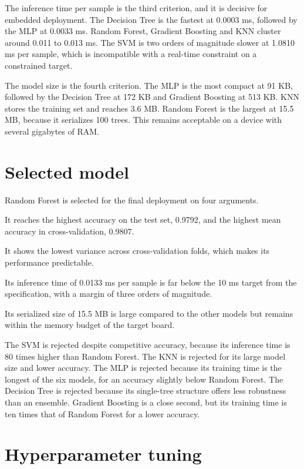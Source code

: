 The inference time per sample is the third criterion, and it is decisive for embedded deployment. The Decision Tree is the fastest at 0.0003 ms, followed by the MLP at 0.0033 ms. Random Forest, Gradient Boosting and KNN cluster around 0.011 to 0.013 ms. The SVM is two orders of magnitude slower at 1.0810 ms per sample, which is incompatible with a real-time constraint on a constrained target.

The model size is the fourth criterion. The MLP is the most compact at 91 KB, followed by the Decision Tree at 172 KB and Gradient Boosting at 513 KB. KNN stores the training set and reaches 3.6 MB. Random Forest is the largest at 15.5 MB, because it serializes 100 trees. This remains acceptable on a device with several gigabytes of RAM.

\section{Selected model}

Random Forest is selected for the final deployment on four arguments.

It reaches the highest accuracy on the test set, 0.9792, and the highest mean accuracy in cross-validation, 0.9807.

It shows the lowest variance across cross-validation folds, which makes its performance predictable.

Its inference time of 0.0133 ms per sample is far below the 10 ms target from the specification, with a margin of three orders of magnitude.

Its serialized size of 15.5 MB is large compared to the other models but remains within the memory budget of the target board.

The SVM is rejected despite competitive accuracy, because its inference time is 80 times higher than Random Forest. The KNN is rejected for its large model size and lower accuracy. The MLP is rejected because its training time is the longest of the six models, for an accuracy slightly below Random Forest. The Decision Tree is rejected because its single-tree structure offers less robustness than an ensemble. Gradient Boosting is a close second, but its training time is ten times that of Random Forest for a lower accuracy.

\section{Hyperparameter tuning}
\label{sec:tuning}


